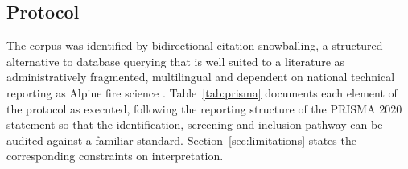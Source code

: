 \documentclass[11pt,a4paper]{article}
\begin{document}
\subsection{Protocol}

The corpus was identified by bidirectional citation snowballing, a structured alternative to database querying that is well suited to a literature as administratively fragmented, multilingual and dependent on national technical reporting as Alpine fire science \citep{mantero_influence_2020}. Table~\ref{tab:prisma} documents each element of the protocol as executed, following the reporting structure of the PRISMA 2020 statement so that the identification, screening and inclusion pathway can be audited against a familiar standard. Section~\ref{sec:limitations} states the corresponding constraints on interpretation.
\end{document}
